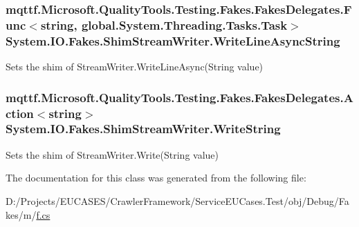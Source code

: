 \hypertarget{class_system_1_1_i_o_1_1_fakes_1_1_shim_stream_writer_ab5641afb1806d90a52acc86ca822b02c}{
\subsubsection[{Write\-Line\-Async\-String}]{\setlength{\rightskip}{0pt plus 5cm}mqttf.\-Microsoft.\-Quality\-Tools.\-Testing.\-Fakes.\-Fakes\-Delegates.\-Func$<$string, global.\-System.\-Threading.\-Tasks.\-Task$>$ System.\-I\-O.\-Fakes.\-Shim\-Stream\-Writer.\-Write\-Line\-Async\-String\hspace{0.3cm}{\ttfamily [set]}}}\label{class_system_1_1_i_o_1_1_fakes_1_1_shim_stream_writer_ab5641afb1806d90a52acc86ca822b02c}


Sets the shim of Stream\-Writer.\-Write\-Line\-Async(\-String value)

\hypertarget{class_system_1_1_i_o_1_1_fakes_1_1_shim_stream_writer_a7a430bee92caa3e241ac77a88535051b}{
\subsubsection[{Write\-String}]{\setlength{\rightskip}{0pt plus 5cm}mqttf.\-Microsoft.\-Quality\-Tools.\-Testing.\-Fakes.\-Fakes\-Delegates.\-Action$<$string$>$ System.\-I\-O.\-Fakes.\-Shim\-Stream\-Writer.\-Write\-String\hspace{0.3cm}{\ttfamily [set]}}}\label{class_system_1_1_i_o_1_1_fakes_1_1_shim_stream_writer_a7a430bee92caa3e241ac77a88535051b}


Sets the shim of Stream\-Writer.\-Write(\-String value)



The documentation for this class was generated from the following file\-:\begin{DoxyCompactItemize}
\item 
D\-:/\-Projects/\-E\-U\-C\-A\-S\-E\-S/\-Crawler\-Framework/\-Service\-E\-U\-Cases.\-Test/obj/\-Debug/\-Fakes/m/\hyperlink{m_2f_8cs}{f.\-cs}\end{DoxyCompactItemize}
